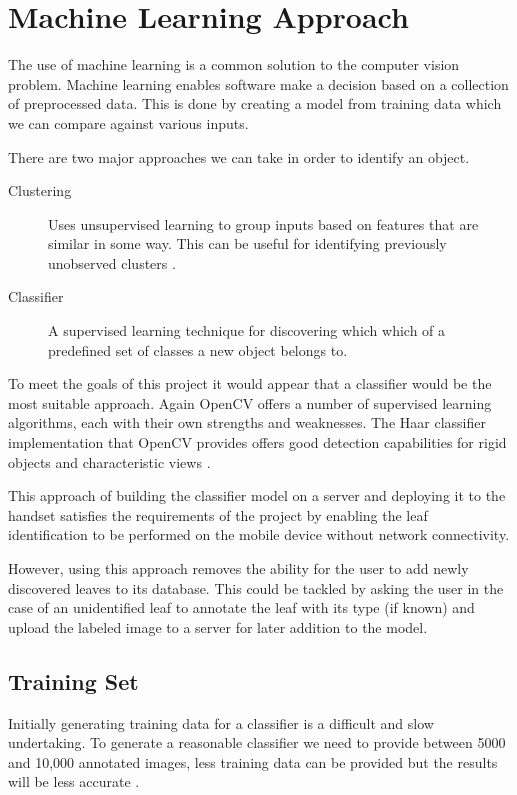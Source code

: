 \section{Machine Learning Approach}

The use of machine learning is a common solution to the computer vision problem. Machine learning enables software make a decision based on a collection of preprocessed data. This is done by creating a model from training data which we can compare against various inputs.

There are two major approaches we can take in order to identify an object.

\begin{description}
\item[Clustering] Uses unsupervised learning to group inputs based on features that are similar in some way. This can be useful for identifying previously unobserved clusters \cite{agarwal03}. 
\item[Classifier] A supervised learning technique for discovering which which of a predefined set of classes a new object belongs to.
\end{description}

To meet the goals of this project it would appear that a classifier would be the most suitable approach. Again OpenCV offers a number of supervised learning algorithms, each with their own strengths and weaknesses. The Haar classifier implementation that OpenCV provides offers good detection capabilities for rigid objects and characteristic views \cite{bradski08}.

This approach of building the classifier model on a server and deploying it to the handset satisfies the requirements of the project by enabling the leaf identification to be performed on the mobile device without network connectivity. 

However, using this approach removes the ability for the user to add newly discovered leaves to its database. This could be tackled by asking the user in the case of an unidentified leaf to annotate the leaf with its type (if known) and upload the labeled image to a server for later addition to the model.


\subsection{Training Set}

Initially generating training data for a classifier is a difficult and slow undertaking. To generate a reasonable classifier we need to provide between 5000 and 10,000 annotated images, less training data can be provided but the results will be less accurate \cite{bradski08, seo08}.


